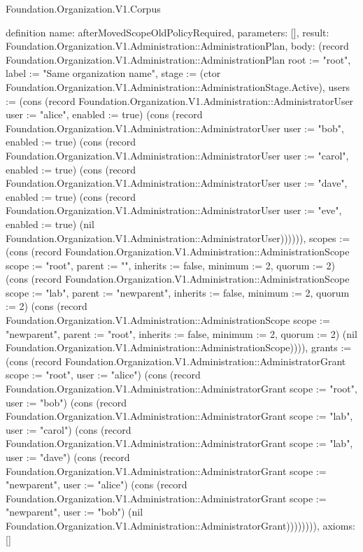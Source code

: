 \begin{lexlean}{Foundation.Organization.V1.Corpus}
\begin{semanticmodule}
definition{
  name: afterMovedScopeOldPolicyRequired,
  parameters: [],
  result: Foundation.Organization.V1.Administration::AdministrationPlan,
  body: (record Foundation.Organization.V1.Administration::AdministrationPlan {root := "root", label := "Same organization name", stage := (ctor Foundation.Organization.V1.Administration::AdministrationStage.Active), users := (cons (record Foundation.Organization.V1.Administration::AdministratorUser {user := "alice", enabled := true}) (cons (record Foundation.Organization.V1.Administration::AdministratorUser {user := "bob", enabled := true}) (cons (record Foundation.Organization.V1.Administration::AdministratorUser {user := "carol", enabled := true}) (cons (record Foundation.Organization.V1.Administration::AdministratorUser {user := "dave", enabled := true}) (cons (record Foundation.Organization.V1.Administration::AdministratorUser {user := "eve", enabled := true}) (nil Foundation.Organization.V1.Administration::AdministratorUser)))))), scopes := (cons (record Foundation.Organization.V1.Administration::AdministrationScope {scope := "root", parent := "", inherits := false, minimum := 2, quorum := 2}) (cons (record Foundation.Organization.V1.Administration::AdministrationScope {scope := "lab", parent := "newparent", inherits := false, minimum := 2, quorum := 2}) (cons (record Foundation.Organization.V1.Administration::AdministrationScope {scope := "newparent", parent := "root", inherits := false, minimum := 2, quorum := 2}) (nil Foundation.Organization.V1.Administration::AdministrationScope)))), grants := (cons (record Foundation.Organization.V1.Administration::AdministratorGrant {scope := "root", user := "alice"}) (cons (record Foundation.Organization.V1.Administration::AdministratorGrant {scope := "root", user := "bob"}) (cons (record Foundation.Organization.V1.Administration::AdministratorGrant {scope := "lab", user := "carol"}) (cons (record Foundation.Organization.V1.Administration::AdministratorGrant {scope := "lab", user := "dave"}) (cons (record Foundation.Organization.V1.Administration::AdministratorGrant {scope := "newparent", user := "alice"}) (cons (record Foundation.Organization.V1.Administration::AdministratorGrant {scope := "newparent", user := "bob"}) (nil Foundation.Organization.V1.Administration::AdministratorGrant)))))))}),
  axioms: []
}


\end{semanticmodule}
\end{lexlean}
